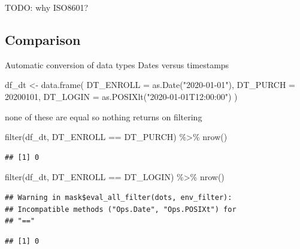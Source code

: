 \documentclass[
]{krantz}
\makeatletter
\newenvironment{Shaded}{\begin{snugshade}}{\end{snugshade}}
\newcommand{\AttributeTok}[1]{\textcolor[rgb]{0.61,0.61,0.61}{#1}}
\newcommand{\DecValTok}[1]{\textcolor[rgb]{0.06,0.06,0.06}{#1}}
\newcommand{\FunctionTok}[1]{\textcolor[rgb]{0,0,0}{#1}}
\newcommand{\NormalTok}[1]{#1}
\newcommand{\OtherTok}[1]{\textcolor[rgb]{0.37,0.37,0.37}{#1}}
\newcommand{\SpecialCharTok}[1]{\textcolor[rgb]{0,0,0}{#1}}
\newcommand{\StringTok}[1]{\textcolor[rgb]{0.5,0.5,0.5}{#1}}
\newenvironment{kframe}{%
\medskip{}
\setlength{\fboxsep}{.8em}
 \def\at@end@of@kframe{}%
 \ifinner\ifhmode%
  \def\at@end@of@kframe{\end{minipage}}%
  \begin{minipage}{\columnwidth}%
 \fi\fi%
 \def\FrameCommand##1{\hskip\@totalleftmargin \hskip-\fboxsep
 \colorbox{shadecolor}{##1}\hskip-\fboxsep
     \hskip-\linewidth \hskip-\@totalleftmargin \hskip\columnwidth}%
 \MakeFramed {\advance\hsize-\width
   \@totalleftmargin\z@ \linewidth\hsize
   \@setminipage}}%
 {\par\unskip\endMakeFramed%
 \at@end@of@kframe}
\renewenvironment{Shaded}{\begin{kframe}}{\end{kframe}}
\makeatother
\begin{document}
TODO: why ISO8601?

\hypertarget{comparison-2}{%
\subsection{Comparison}\label{comparison-2}}

Automatic conversion of data types
Dates versus timestamps

\begin{Shaded}
\begin{Highlighting}[]
\NormalTok{df\_dt }\OtherTok{\textless{}{-}}
\FunctionTok{data.frame}\NormalTok{(}
  \AttributeTok{DT\_ENROLL =} \FunctionTok{as.Date}\NormalTok{(}\StringTok{"2020{-}01{-}01"}\NormalTok{),}
  \AttributeTok{DT\_PURCH  =} \DecValTok{20200101}\NormalTok{,}
  \AttributeTok{DT\_LOGIN  =} \FunctionTok{as.POSIXlt}\NormalTok{(}\StringTok{"2020{-}01{-}01T12:00:00"}\NormalTok{) }
\NormalTok{  )}
\end{Highlighting}
\end{Shaded}

none of these are equal so nothing returns on filtering

\begin{Shaded}
\begin{Highlighting}[]
\FunctionTok{filter}\NormalTok{(df\_dt, DT\_ENROLL }\SpecialCharTok{==}\NormalTok{ DT\_PURCH) }\SpecialCharTok{\%\textgreater{}\%} \FunctionTok{nrow}\NormalTok{()}
\end{Highlighting}
\end{Shaded}

\begin{verbatim}
## [1] 0
\end{verbatim}

\begin{Shaded}
\begin{Highlighting}[]
\FunctionTok{filter}\NormalTok{(df\_dt, DT\_ENROLL }\SpecialCharTok{==}\NormalTok{ DT\_LOGIN) }\SpecialCharTok{\%\textgreater{}\%} \FunctionTok{nrow}\NormalTok{()}
\end{Highlighting}
\end{Shaded}

\begin{verbatim}
## Warning in mask$eval_all_filter(dots, env_filter):
## Incompatible methods ("Ops.Date", "Ops.POSIXt") for
## "=="
\end{verbatim}

\begin{verbatim}
## [1] 0
\end{verbatim}
\end{document}
